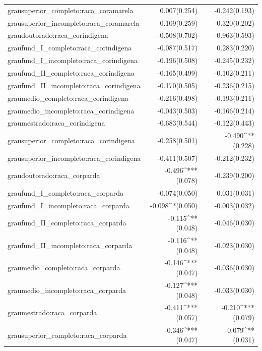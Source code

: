 \documentclass[
  12pt,
  letterpaper,
  DIV=11,
  numbers=noendperiod]{scrartcl}
\begin{document}
\begin{table}[!htbp]
\begin{tabular}{@{\extracolsep{5pt}}lD{.}{.}{-3} D{.}{.}{-3} }
  grausuperior\_completo:raca\_coramarela & 0.007$ $(0.254) & -0.242$ $(0.193) \\ 
  grausuperior\_incompleto:raca\_coramarela & 0.109$ $(0.259) & -0.320$ $(0.202) \\ 
  graudoutorado:raca\_corindigena & -0.508$ $(0.702) & -0.963$ $(0.593) \\ 
  graufund\_I\_completo:raca\_corindigena & -0.087$ $(0.517) & 0.283$ $(0.220) \\ 
  graufund\_I\_incompleto:raca\_corindigena & -0.196$ $(0.508) & -0.245$ $(0.232) \\ 
  graufund\_II\_completo:raca\_corindigena & -0.165$ $(0.499) & -0.102$ $(0.211) \\ 
  graufund\_II\_incompleto:raca\_corindigena & -0.170$ $(0.505) & -0.236$ $(0.215) \\ 
  graumedio\_completo:raca\_corindigena & -0.216$ $(0.498) & -0.193$ $(0.211) \\ 
  graumedio\_incompleto:raca\_corindigena & -0.043$ $(0.503) & -0.166$ $(0.214) \\ 
  graumestrado:raca\_corindigena & -0.683$ $(0.544) & -0.122$ $(0.443) \\ 
  grausuperior\_completo:raca\_corindigena & -0.258$ $(0.501) & -0.490^{**}$ $(0.228) \\ 
  grausuperior\_incompleto:raca\_corindigena & -0.411$ $(0.507) & -0.212$ $(0.232) \\ 
  graudoutorado:raca\_corparda & -0.496^{***}$ $(0.078) & -0.239$ $(0.200) \\ 
  graufund\_I\_completo:raca\_corparda & -0.074$ $(0.050) & 0.031$ $(0.031) \\ 
  graufund\_I\_incompleto:raca\_corparda & -0.098^{*}$ $(0.050) & -0.003$ $(0.032) \\ 
  graufund\_II\_completo:raca\_corparda & -0.115^{**}$ $(0.048) & -0.046$ $(0.030) \\ 
  graufund\_II\_incompleto:raca\_corparda & -0.116^{**}$ $(0.048) & -0.023$ $(0.030) \\ 
  graumedio\_completo:raca\_corparda & -0.146^{***}$ $(0.047) & -0.036$ $(0.030) \\ 
  graumedio\_incompleto:raca\_corparda & -0.127^{***}$ $(0.048) & -0.033$ $(0.030) \\ 
  graumestrado:raca\_corparda & -0.411^{***}$ $(0.057) & -0.210^{***}$ $(0.079) \\ 
  grausuperior\_completo:raca\_corparda & -0.346^{***}$ $(0.047) & -0.079^{**}$ $(0.031) \\ 

\end{tabular}
\end{table}
\end{document}
